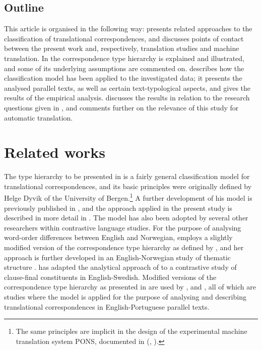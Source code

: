 \documentclass[output=paper]{LSP/langsci}
\begin{document}
\subsection{Outline}\label{sec:thunes:1.2}

This article is organised in the following way:  presents related approaches to the classification of translational correspondences, and discusses points of contact between the present work and, respectively, translation studies and machine translation. In  the correspondence type hierarchy is explained and illustrated, and some of its underlying assumptions are commented on.  describes how the classification model has been applied to the investigated data; it presents the analysed parallel texts, as well as certain text-typological aspects, and gives the results of the empirical analysis.  discusses the results in relation to the research questions given in , and comments further on the relevance of this study for automatic translation. 

\section{Related works}\label{sec:thunes:2}

The type hierarchy to be presented in  is a fairly general classification model for translational correspondences, and its basic principles were originally defined by Helge Dyvik of the University of Bergen.\footnote{ The same principles are implicit in the design of the experimental machine translation system PONS, documented in (\citealt{Dyvik1990}, \citeyear{Dyvik1995}).} A further development of his model is previously published in \citet{Thunes1998}, and the approach applied in the present study is described in more detail in \citet{Thunes2011}. The model has also been adopted by several other researchers within contrastive language studies. For the purpose of analysing word-order differences between English and Norwegian, \citet{Hasselgård1996} employs a slightly modified version of the correspondence type hierarchy as defined by \citet{Dyvik1993}, and her approach is further developed in an English-Norwegian study of thematic structure \citep{Hasselgård1998}. \citet{Elgemarkfc} has adapted the analytical approach of \citet{Hasselgård1998} to a contrastive study of clause-final constituents in English-Swedish. Modified versions of the correspondence type hierarchy as presented in \citet{Thunes1998} are used by \citet{Tucunduva2007,Silva2008}, and \citet{Azevedofc}, all of which are studies where the model is applied for the purpose of analysing and describing translational correspondences in English-Portuguese parallel texts. 
\end{document}
